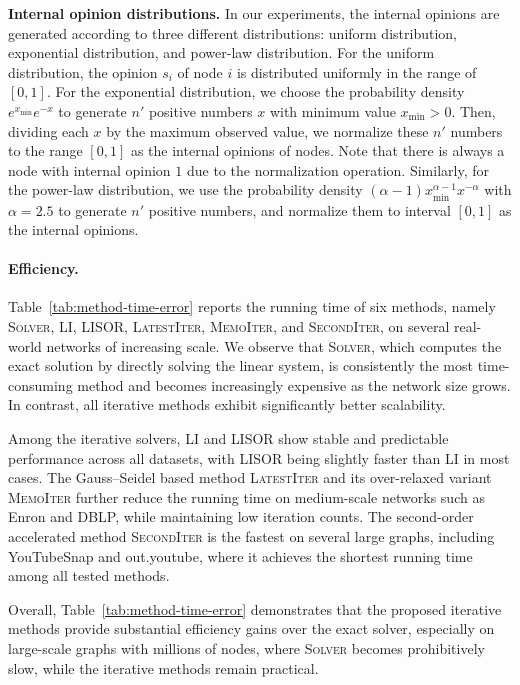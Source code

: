 \documentclass[sigconf,review, nonacm]{acmart}
\begin{document}
\textbf{Internal opinion distributions.}
In our experiments, the internal opinions are generated according to three different distributions: uniform distribution, exponential distribution, and power-law distribution. For the uniform distribution, the opinion $s_i$ of node $i$ is distributed uniformly in the range of $[0,1]$. For the exponential distribution, we choose the probability density $e^{x_{\min}} e^{-x}$ to generate $n'$ positive numbers $x$ with minimum value $x_{\min}>0$. Then, dividing each $x$ by the maximum observed value, we normalize these $n'$ numbers to the range $[0,1]$ as the internal opinions of nodes. Note that there is always a node with internal opinion $1$ due to the normalization operation. Similarly, for the power-law distribution, we use the probability density $(\alpha-1) x_{\min}^{\alpha-1} x^{-\alpha}$ with $\alpha=2.5$ to generate $n'$ positive numbers, and normalize them to interval $[0,1]$ as the internal opinions.



\paragraph{Efficiency.}
Table~\ref{tab:method-time-error} reports the running time of six methods, namely \textsc{Solver}, \textsc{LI}, \textsc{LISOR}, \textsc{LatestIter}, \textsc{MemoIter}, and \textsc{SecondIter}, on several real-world networks of increasing scale.
We observe that \textsc{Solver}, which computes the exact solution by directly solving the linear system, is consistently the most time-consuming method and becomes increasingly expensive as the network size grows.
In contrast, all iterative methods exhibit significantly better scalability.

Among the iterative solvers, \textsc{LI} and \textsc{LISOR} show stable and predictable performance across all datasets, with \textsc{LISOR} being slightly faster than \textsc{LI} in most cases.
The Gauss--Seidel based method \textsc{LatestIter} and its over-relaxed variant \textsc{MemoIter} further reduce the running time on medium-scale networks such as Enron and DBLP, while maintaining low iteration counts.
The second-order accelerated method \textsc{SecondIter} is the fastest on several large graphs, including YouTubeSnap and out.youtube, where it achieves the shortest running time among all tested methods.

Overall, Table~\ref{tab:method-time-error} demonstrates that the proposed iterative methods provide substantial efficiency gains over the exact solver, especially on large-scale graphs with millions of nodes, where \textsc{Solver} becomes prohibitively slow, while the iterative methods remain practical.
\end{document}
